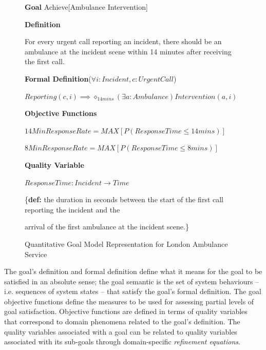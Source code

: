\begin{figure}[!hbtp]
    \begin{mdframed}
        \noindent
        \textbf{Goal} Achieve[Ambulance Intervention] 
        
        \noindent
        \textbf{Definition}
        
        \noindent
        For every urgent call reporting an incident, there should be an ambulance at the incident scene within 14 minutes after receiving the first call.
        
        \noindent
        \textbf{Formal Definition}($\forall i:Incident, c:UrgentCall$)
        
        $Reporting(c,i) \implies \diamond_{14mins} (\exists a:Ambulance) Intervention(a,i)$
        
        \noindent
        \textbf{Objective Functions}
        
        $14MinResponseRate = MAX[P(ResponseTime \leq 14 mins)]$
        
        $8MinResponseRate = MAX[P(ResponseTime \leq 8 mins)]$
        
        \noindent
        \textbf{Quality Variable}
        
        $ResponseTime: Incident \rightarrow Time$
        
        \{\textbf{def:} the duration in seconds between the start of the first call reporting the incident and the 
        
        arrival of the first ambulance at the incident scene.\}    
    \end{mdframed}
    
    
    \caption{Quantitative Goal Model Representation for London Ambulance Service}
    \label{fig:pgsr}
\end{figure}



The goal's definition and formal definition define what it means for the goal to be satisfied in an absolute sense; the goal semantic is the set of system behaviours – i.e. sequences of system states – that satisfy the goal's formal definition. The goal objective functions define the measures to be used for assessing partial levels of goal satisfaction. Objective functions are defined in terms of quality variables that correspond to domain phenomena related to the goal's definition. The quality variables associated with a goal can be related to quality variables associated with its sub-goals through domain-specific \textit{refinement equations}. 

